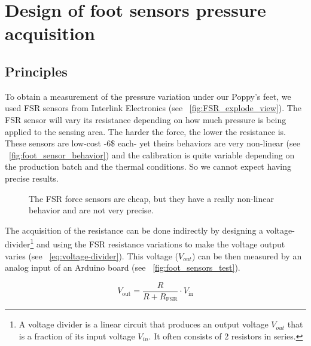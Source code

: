 
\chapter{Design of foot sensors pressure acquisition} %
\label{appendix:design_FSR}


\section{Principles} %
To obtain a measurement of the pressure variation under our Poppy's feet, we used FSR sensors from Interlink Electronics (see \figurename~\ref{fig:FSR_explode_view}). The FSR sensor will vary its resistance depending on how much pressure is being applied to the sensing area. The harder the force, the lower the resistance is. These sensors are low-cost -6\$ each- yet theirs behaviors are very non-linear (see \figurename~\ref{fig:foot_sensor_behavior}) and the calibration is quite variable depending on the production batch and the thermal conditions. So we cannot expect having precise results.

\begin{figure}[ht]
\centering
    \hfil
    \caption{The FSR force sensors are cheap, but they have a really non-linear behavior and are not very precise.}

\end{figure}

The acquisition of the resistance can be done indirectly by designing a voltage-divider\footnote{A voltage divider is a linear circuit that produces an output voltage $V_{out}$ that is a fraction of its input voltage $V_{in}$. It often consists of 2 resistors in series.} and using the FSR resistance variations to make the voltage output varies (see \equationname~\ref{eq:voltage-divider}). This voltage ($V_{out}$) can be then measured by an analog input of an Arduino board (see \figurename~\ref{fig:foot_sensors_test}).

\begin{equation}
    V_\mathrm{out} = \frac{R}{R+R_\mathrm{FSR}} \cdot V_\mathrm{in}
\label{eq:voltage-divider}
\end{equation}


